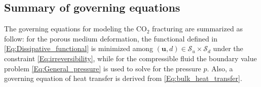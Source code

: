 
\subsection{Summary of governing equations} The governing equations for modeling the CO$_2$ fracturing are summarized as follow: for the porous medium deformation, the functional defined in \eqref{Eq:Dissipative_functional} is minimized among $(\bm{u},d)\in \mathscr{S}_u\times\mathscr{S}_d$ under the constraint \eqref{Eq:irreversibility}, while %
for the compressible fluid the boundary value problem \eqref{Eq:General_pressure} is used to solve for the pressure $p$. Also, a governing equation of heat transfer is derived from \eqref{Eq:bulk_heat_transfer}.